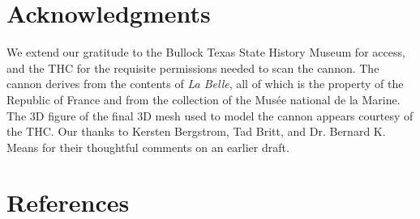 \documentclass[review]{elsarticle}
\begin{document}
\section*{Acknowledgments}

We extend our gratitude to the Bullock Texas State History Museum for access, and the THC for the requisite permissions needed to scan the cannon. The cannon derives from the contents of \textit{La Belle}, all of which is the property of the Republic of France and from the collection of the Musée national de la Marine. The 3D figure of the final 3D mesh used to model the cannon appears courtesy of the THC. Our thanks to Kersten Bergstrom, Tad Britt, and Dr. Bernard K. Means for their thoughtful comments on an earlier draft.

\section*{References}



\end{document}
